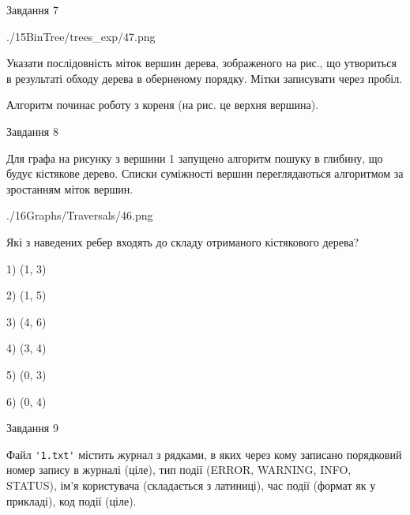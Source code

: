 \documentclass[12pt, ukrainian]{article}
\def\code#1{\Verb!#1!}
\begin{document}
{\vspace{10mm}\par

\newpage
\begin{minipage}[t]{9.7cm}
               
{\begin{center}Завдання {7}\end{center}}
\vspace{-6mm}

\begin{center}
	{./15BinTree/trees_exp/47.png}
\end{center}
Указати послідовність міток вершин дерева, зображеного на рис., що утвориться в результаті обходу дерева в оберненому порядку. Мітки записувати через пробіл.\par Алгоритм починає роботу з кореня (на рис. це верхня вершина).\par

\end{minipage}
\vline \hspace{8mm}
\begin{minipage}[t]{8.0cm}
               
{\begin{center}Завдання {8}\end{center}}
\vspace{-6mm}
Для графа на рисунку з вершини 1 запущено алгоритм пошуку в глибину, що будує кістякове дерево. Списки суміжності вершин переглядаються алгоритмом за зростанням міток вершин.\par
\begin{center}
	{./16Graphs/Traversals/46.png}
\end{center}
\par Які з наведених ребер входять до складу отриманого кістякового дерева?\par
1) (1, 3)\par
2) (1, 5)\par
3) (4, 6)\par
4) (3, 4)\par
5) (0, 3)\par
6) (0, 4)\par
{\vskip 15pt} \par

\end{minipage}

               
{\begin{center}Завдання {9}\end{center}}
\vspace{-6mm}
Файл \code{'1.txt'} містить журнал з рядками, в яких через кому записано поряд\-ко\-вий номер запису в журналі (ціле), тип події (ERROR, WARNING, INFO, STATUS), ім'я користувача (складається з латиниці), час події (фор\-мат як у прикладі), код події (ціле).

}
\end{document}
